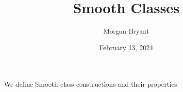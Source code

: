 \documentclass[a4paper]{article}
\title{Smooth Classes}
\date{February 13, 2024}
\author{Morgan Bryant}
\begin{document}
\maketitle
\par{We define Smooth class constructions and their properties}
\printbibliography
\end{document}
